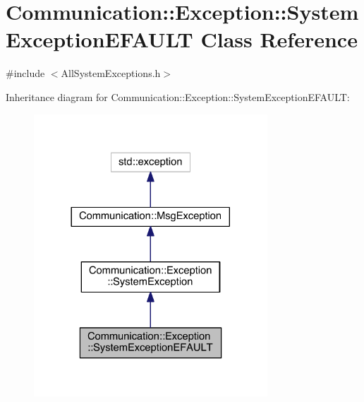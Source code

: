 \hypertarget{class_communication_1_1_exception_1_1_system_exception_e_f_a_u_l_t}{}\section{Communication\+:\+:Exception\+:\+:System\+Exception\+E\+F\+A\+U\+L\+T Class Reference}
\label{class_communication_1_1_exception_1_1_system_exception_e_f_a_u_l_t}


{\ttfamily \#include $<$All\+System\+Exceptions.\+h$>$}



Inheritance diagram for Communication\+:\+:Exception\+:\+:System\+Exception\+E\+F\+A\+U\+L\+T\+:\nopagebreak
\begin{figure}[H]
\begin{center}
\leavevmode
\includegraphics[width=248pt]{class_communication_1_1_exception_1_1_system_exception_e_f_a_u_l_t__inherit__graph}
\end{center}
\end{figure}


